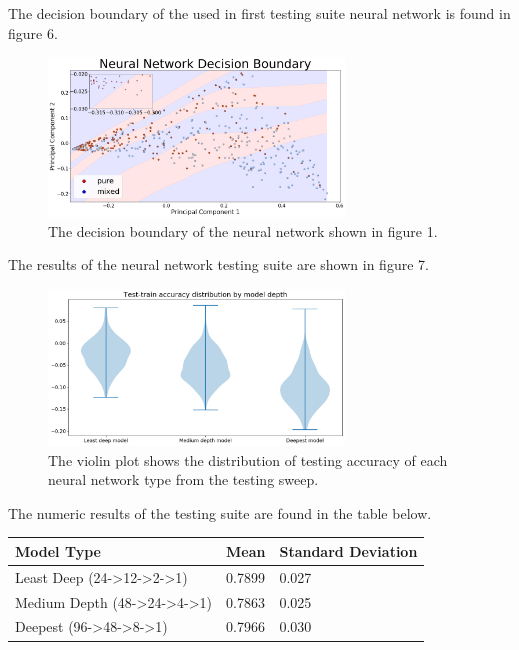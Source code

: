 \documentclass[12pt]{article}
\begin{document}
The decision boundary of the used in first testing suite neural network is found in figure 6. 
\begin{figure}[H]
\centering
\includegraphics[width=0.7\textwidth]{decboundary}
\caption{The decision boundary of the neural network shown in figure 1.}
\end{figure}
The results of the neural network testing suite are shown in figure 7. 
\begin{figure}[H]
\centering
\includegraphics[width=0.7\textwidth]{testOut1289}
\caption{The violin plot shows the distribution of testing accuracy of each neural network type from the testing sweep.}
\end{figure}
The numeric results of the testing suite are found in the table below.  

\begin{table}[H]
\centering
\begin{tabular}{l|l|l}
\hline
\multicolumn{1}{|l|}{Model Type}                                   & Mean   & \multicolumn{1}{l|}{Standard Deviation} \\ \hline
Least Deep (24-\textgreater{}12-\textgreater{}2-\textgreater{}1)   & 0.7899 & 0.027                                   \\
Medium Depth (48-\textgreater{}24-\textgreater{}4-\textgreater{}1) & 0.7863 & 0.025                                   \\
Deepest (96-\textgreater{}48-\textgreater{}8-\textgreater{}1)      & 0.7966 & 0.030                                  
\end{tabular}
\end{table}
\end{document}
